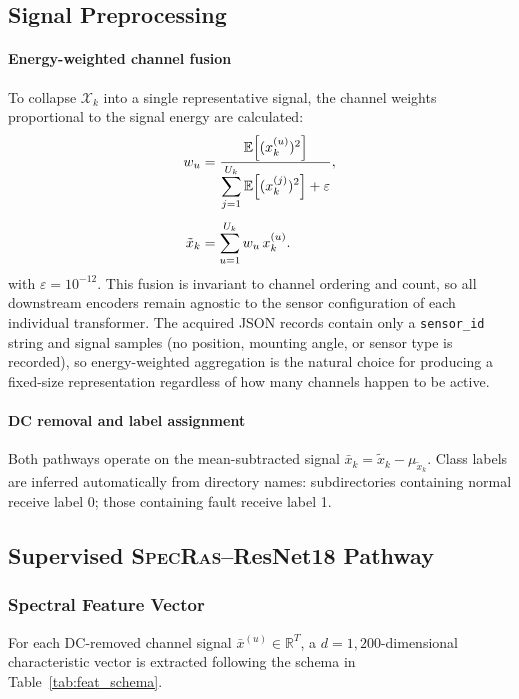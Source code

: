 \documentclass[preprint,12pt,3p]{elsarticle}
\newcommand{\zerone}{\textsc{SpecRas}\xspace}      %
\newcommand{\R}{\mathbb{R}}
\newcommand{\E}{\mathbb{E}}
\begin{document}
\subsection{Signal Preprocessing}
\label{sec:preprocess}

\paragraph{Energy-weighted channel fusion}
To collapse $\mathcal{X}_k$ into a single representative signal,
the channel weights proportional to the signal energy are calculated:
%
\begin{align}
  w_u &= \frac{
    \E\!\left[(x_k^{(u)})^2\right]
  }{
    \displaystyle\sum_{j=1}^{U_k}
      \E\!\left[(x_k^{(j)})^2\right] + \varepsilon
  }, \label{eq:energy_weight} \\[4pt]
  \tilde{x}_k &= \sum_{u=1}^{U_k} w_u \, x_k^{(u)}. \notag
\end{align}
%
with $\varepsilon = 10^{-12}$.
This fusion is invariant to channel ordering and count, so all
downstream encoders remain agnostic to the sensor configuration of
each individual transformer.
The acquired JSON records contain only a \texttt{sensor\_id} string
and signal samples (no position, mounting angle, or sensor type is
recorded), so energy-weighted aggregation is the natural choice for
producing a fixed-size representation regardless of how many channels
happen to be active.

\paragraph{DC removal and label assignment}
Both pathways operate on the mean-subtracted signal
$\bar{x}_k = \tilde{x}_k - \mu_{\tilde{x}_k}$.
Class labels are inferred automatically from directory names:
subdirectories containing normal receive label 0; those
containing fault receive label 1.


\subsection{Supervised \zerone--ResNet18 Pathway}
\label{sec:zerone}

\subsubsection{Spectral Feature Vector}
\label{sec:feat_vec}

For each DC-removed channel signal $\bar{x}^{(u)} \in \R^T$, a
$d = 1{,}200$-dimensional characteristic vector is extracted following the
schema in Table~\ref{tab:feat_schema}.
\end{document}
